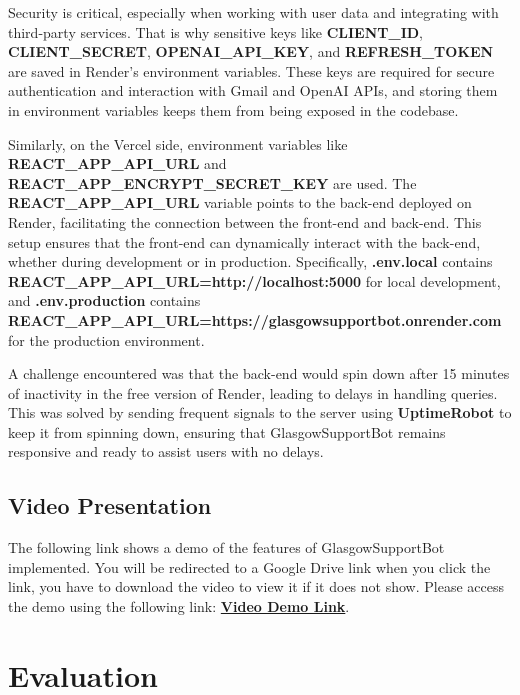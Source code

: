 \documentclass{l4proj}
\begin{document}
Security is critical, especially when working with user data and integrating with third-party services. That is why sensitive keys like \textbf{CLIENT\_ID}, \textbf{CLIENT\_SECRET}, \textbf{OPENAI\_API\_KEY}, and \textbf{REFRESH\_TOKEN} are saved in Render's environment variables. These keys are required for secure authentication and interaction with Gmail and OpenAI APIs, and storing them in environment variables keeps them from being exposed in the codebase.

Similarly, on the Vercel side, environment variables like \textbf{REACT\_APP\_API\_URL} and \textbf{REACT\_APP\_ENCRYPT\_SECRET\_KEY} are used. The \textbf{REACT\_APP\_API\_URL} variable points to the back-end deployed on Render, facilitating the connection between the front-end and back-end. This setup ensures that the front-end can dynamically interact with the back-end, whether during development or in production. Specifically, \textbf{.env.local} contains \textbf{REACT\_APP\_API\_URL=http://localhost:5000} for local development, and \textbf{.env.production} contains \textbf{REACT\_APP\_API\_URL=https://glasgowsupportbot.onrender.com} for the production environment.

A challenge encountered was that the back-end would spin down after 15 minutes of inactivity in the free version of Render, leading to delays in handling queries. This was solved by sending frequent signals to the server using \textbf{UptimeRobot} to keep it from spinning down, ensuring that GlasgowSupportBot remains responsive and ready to assist users with no delays.

\section{Video Presentation}
The following link shows a demo of the features of GlasgowSupportBot implemented. You will be redirected to a Google Drive link when you click the link, you have to download the video to view it if it does not show.
Please access the demo using the following link: \href{https://drive.google.com/file/d/1ENyZklw4Tr3q2ZPeKW_s2tfDCbhWVlvJ/view?usp=drive_link}{\textbf{Video Demo Link}}.

\chapter{Evaluation} 
\end{document}
